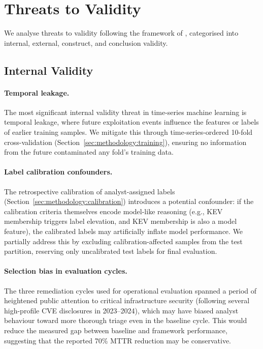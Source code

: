 \documentclass[review,12pt]{elsarticle}
\begin{document}
\section{Threats to Validity}
\label{sec:threats}

We analyse threats to validity following the framework of \citet{wohlin2012}, categorised into internal, external, construct, and conclusion validity.

\subsection{Internal Validity}

\paragraph{Temporal leakage.} The most significant internal validity threat in time-series machine learning is temporal leakage, where future exploitation events influence the features or labels of earlier training samples. We mitigate this through time-series-ordered 10-fold cross-validation (Section~\ref{sec:methodology:training}), ensuring no information from the future contaminated any fold's training data.

\paragraph{Label calibration confounders.} The retrospective calibration of analyst-assigned labels (Section~\ref{sec:methodology:calibration}) introduces a potential confounder: if the calibration criteria themselves encode model-like reasoning (e.g., KEV membership triggers label elevation, and KEV membership is also a model feature), the calibrated labels may artificially inflate model performance. We partially address this by excluding calibration-affected samples from the test partition, reserving only uncalibrated test labels for final evaluation.

\paragraph{Selection bias in evaluation cycles.} The three remediation cycles used for operational evaluation spanned a period of heightened public attention to critical infrastructure security (following several high-profile CVE disclosures in 2023--2024), which may have biased analyst behaviour toward more thorough triage even in the baseline cycle. This would reduce the measured gap between baseline and framework performance, suggesting that the reported 70\% MTTR reduction may be conservative.
\end{document}
